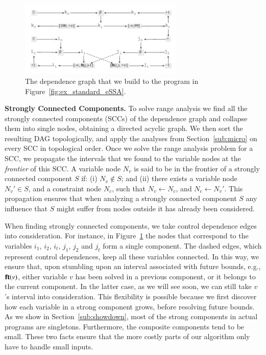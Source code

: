 \documentclass[preprint]{elsarticle}
\newcommand{\fun}[1]{\mbox{\textbf{#1}}}
\begin{document}
\begin{figure}[t!]
\begin{center}
\includegraphics[width=0.7\textwidth]{images/ex_graph}
\end{center}
\caption{\label{fig:ex_graph}
The dependence graph that we build to the program in
Figure~\ref{fig:ex_standard_eSSA}.}
\end{figure}

\noindent
\textbf{Strongly Connected Components.}
To solve range analysis we find all the strongly connected components (SCCs) of
the dependence graph and collapse them into single nodes, obtaining a
directed acyclic graph.
We then sort the resulting DAG topologically, and apply the analyses from
Section~\ref{sub:micro} on every SCC in topological order.
Once we solve the range analysis problem for a SCC, we propagate the
intervals that we found to the variable nodes at the {\em frontier} of this
SCC.
A variable node $N_v$ is said to be in the frontier of a strongly connected
component $S$ if:
(i) $N_v \notin S$; and
(ii) there exists a variable node $N_v' \in S$, and a constraint node $N_c$,
such that $N_v \leftarrow N_c$, and $N_c \leftarrow N_v'$.
This propagation ensures that when analyzing a strongly connected component $S$
any influence that $S$ might suffer from nodes outside it has already been
considered.

When finding strongly connected components, we take control dependence
edges into consideration.
For instance, in Figure~\ref{fig:ex_graph} the nodes that correspond to the
variables $i_1$, $i_2$, $i_t$, $j_1$, $j_2$ and $j_t$ form a single component.
The dashed edges, which represent control dependences, keep all these variables
connected.
In this way, we ensure that, upon stumbling upon an interval associated with
future bounds, e.g., $\fun{ft}(v)$, either variable $v$ has been solved in a
previous component, or it belongs to the current component.
In the latter case, as we will see soon, we can still take $v$'s interval into
consideration.
This flexibility is possible because we first discover how each variable in
a strong component grows, before resolving future bounds.
As we show in Section~\ref{sub:showdown}, most of the strong components in
actual programs are singletons.
Furthermore, the composite components tend to be small.
These two facts ensure that the more costly parts of our algorithm only have to
handle small inputs.
\end{document}
